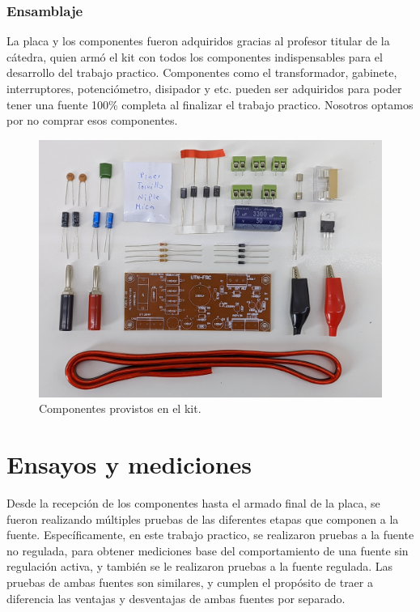 \documentclass[chaptersright]{informeutn}
\begin{document}
        \subsection{Ensamblaje}
          La placa y los componentes fueron adquiridos gracias al profesor titular de la cátedra, quien armó el kit
          con todos los componentes indispensables para el desarrollo del trabajo practico. Componentes como el
          transformador, gabinete, interruptores, potenciómetro, disipador y etc. pueden ser adquiridos para poder
          tener una fuente 100\% completa al finalizar el trabajo practico. Nosotros optamos por no comprar esos
          componentes.
          \begin{figure}[!h]
            \centering
            \includegraphics[width=1\textwidth]{pictures/components.jpg}
            \caption{Componentes provistos en el kit.}
          \end{figure}

  \chapter{Ensayos y mediciones}
    Desde la recepción de los componentes hasta el armado final de la placa, se fueron realizando múltiples pruebas
    de las diferentes etapas que componen a la fuente. Específicamente, en este trabajo practico, se realizaron pruebas
    a la fuente no regulada, para obtener mediciones base del comportamiento de una fuente sin regulación activa, y
    también se le realizaron pruebas a la fuente regulada. Las pruebas de ambas fuentes son similares, y cumplen el
    propósito de traer a diferencia las ventajas y desventajas de ambas fuentes por separado.
\end{document}
